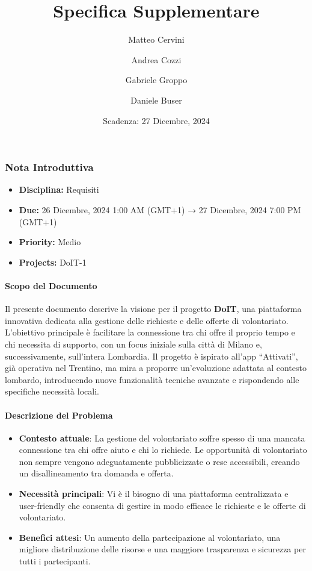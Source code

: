 \title{Specifica Supplementare}
\author{Matteo Cervini \and Andrea Cozzi \and Gabriele Groppo \and Daniele Buser}
\date{Scadenza: 27 Dicembre, 2024}

\maketitle

\subsubsection{Nota Introduttiva}
\begin{itemize}
\item \textbf{Disciplina:} Requisiti
\item \textbf{Due:} 26 Dicembre, 2024 1:00 AM (GMT+1) → 27 Dicembre, 2024 7:00 PM (GMT+1)
\item \textbf{Priority:} Medio
\item \textbf{Projects:} DoIT-1
\end{itemize}

\paragraph{Scopo del Documento}
Il presente documento descrive la visione per il progetto \textbf{DoIT}, una piattaforma innovativa dedicata alla gestione delle richieste e delle offerte di volontariato. L'obiettivo principale è facilitare la connessione tra chi offre il proprio tempo e chi necessita di supporto, con un focus iniziale sulla città di Milano e, successivamente, sull'intera Lombardia. Il progetto è ispirato all'app ``Attivati'', già operativa nel Trentino, ma mira a proporre un'evoluzione adattata al contesto lombardo, introducendo nuove funzionalità tecniche avanzate e rispondendo alle specifiche necessità locali.

\paragraph{Descrizione del Problema}
\begin{itemize}
\item \textbf{Contesto attuale}: La gestione del volontariato soffre spesso di una mancata connessione tra chi offre aiuto e chi lo richiede. Le opportunità di volontariato non sempre vengono adeguatamente pubblicizzate o rese accessibili, creando un disallineamento tra domanda e offerta.
\item \textbf{Necessità principali}: Vi è il bisogno di una piattaforma centralizzata e user-friendly che consenta di gestire in modo efficace le richieste e le offerte di volontariato.
\item \textbf{Benefici attesi}: Un aumento della partecipazione al volontariato, una migliore distribuzione delle risorse e una maggiore trasparenza e sicurezza per tutti i partecipanti.
\end{itemize}

